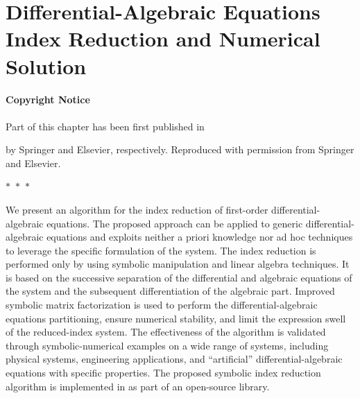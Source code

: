 
\chapter[DAEs Index Reduction and Numerical Solution]{Differential-Algebraic Equations Index Reduction and Numerical Solution}
\label{chap3:daes}

\subsubsection*{Copyright Notice}
Part of this chapter has been first published in
%
\begin{center}
  \begin{minipage}{0.9\textwidth}
  \end{minipage}
\end{center}
\begin{center}
  \begin{minipage}{0.9\textwidth}
  \end{minipage}
\end{center}
%
by Springer and Elsevier, respectively. Reproduced with permission from Springer and Elsevier.

\begin{center}
  $\ast$~$\ast$~$\ast$
\end{center}

We present an algorithm for the index reduction of first-order differential-algebraic equations. The proposed approach can be applied to generic differential-algebraic equations and exploits neither a priori knowledge nor ad hoc techniques to leverage the specific formulation of the system. The index reduction is performed only by using symbolic manipulation and linear algebra techniques. It is based on the successive separation of the differential and algebraic equations of the system and the subsequent differentiation of the algebraic part. Improved symbolic matrix factorization is used to perform the differential-algebraic equations partitioning, ensure numerical stability, and limit the expression swell of the reduced-index system. The effectiveness of the algorithm is validated through symbolic-numerical examples on a wide range of systems, including physical systems, engineering applications, and ``artificial'' differential-algebraic equations with specific properties. The proposed symbolic index reduction algorithm is implemented in \Maple{} as part of an open-source library.

